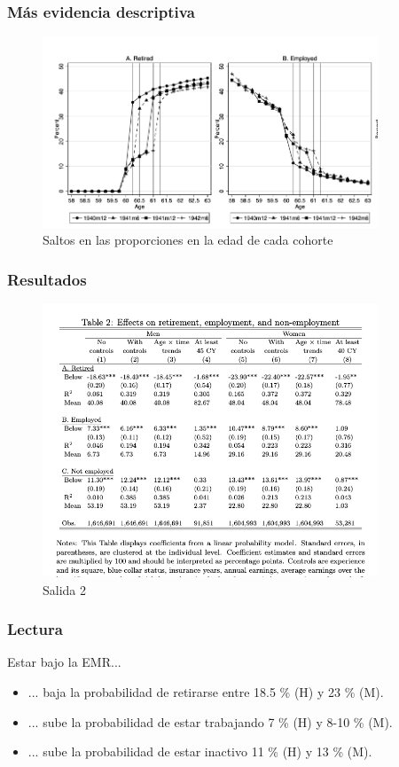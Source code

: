 \documentclass{beamer}
\begin{document}
  \frame
  {
    \frametitle{Más evidencia descriptiva}
      \begin{figure}[htp]
        \centering
        \includegraphics[width=10cm]{imgs/staubli-fig4}
        \caption{Saltos en las proporciones en la edad de cada cohorte}
        \label{fig:fig2}
      \end{figure}
  }
  \frame
  {
    \frametitle{Resultados}
      \begin{figure}[htp]
        \centering
        \includegraphics[width=10cm]{imgs/staubli-tab2}
        \caption{Salida 2}
        \label{fig:fig2}
      \end{figure}
  }
  \frame
  {
    \frametitle{Lectura}
    Estar bajo la EMR...
    \begin{itemize}
    \item ... baja la probabilidad de retirarse entre 18.5 \% (H) y 23 \% (M).
    \item ... sube la probabilidad de estar trabajando 7 \% (H) y 8-10 \% (M).
    \item ... sube la probabilidad de estar inactivo 11 \% (H) y 13 \% (M).         \end{itemize}
  }
  \frame
\end{document}
